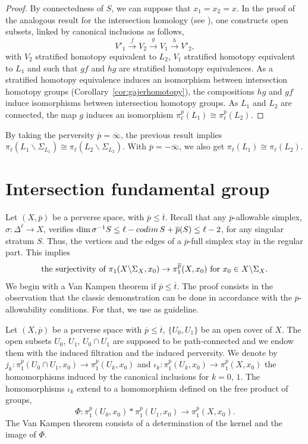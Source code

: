\documentclass[a4paper,10pt,english,reqno]{amsart}
\theoremstyle{plain}
\theoremstyle{definition}
\theoremstyle{remark}
\numberwithin{equation}{section}
\newcommand{\corref}[1]{Corollary~\ref{#1}}
\def\ov{\overline}
\def\codim{{\rm codim\,}}
\def\menos{\backslash}
\renewcommand\1{\hbox{\ding{192}}}
\renewcommand\2{\hbox{\ding{193}}}
\newcommand\3{\hbox{\ding{194}}}
\newcommand\4{\hbox{\ding{195}}}
\begin{document}
\begin{proof}
By connectedness of $S$, we can suppose that $x_1=x_2=x$.
In the proof of the analogous result for the intersection homology  (see \cite[Lemma 5.3.13]{FriedmanBook}),
one constructs  open subsets, linked by canonical inclusions as follows,
$$V'_{1}\xrightarrow{f}V_{2}\xrightarrow{g} V_{1}\xrightarrow{h}V'_{2},
$$
with $V_{2}$ stratified homotopy equivalent to $L_{2}$, $V_{1}$ stratified homotopy equivalent to $L_{1}$
and such that $gf$ and $hg$ are stratified homotopy equivalences.
 As a stratified homotopy equivalence induces an isomorphism between intersection homotopy groups 
(\corref{cor:gajerhomotopy}),
the compositions $hg$ and $gf$ induce isomorphisms between intersection homotopy groups.
As $L_{1}$ and $L_{2}$ are connected, the map  $g$ induces an isomorphism
$\pi_\ell^{\ov  p} (L_1) \cong \pi_\ell^{\ov  p} (L_2)$.
\end{proof}

By taking the perversity $\ov{p}=\ov{\infty}$, the previous result  implies 
$\pi_{\ell}(L_{1}\menos\Sigma_{L_{1}})\cong \pi_{\ell}(L_{2}\menos\Sigma_{L_{2}})$.
% 
With $\ov{p}=-\ov{\infty}$,
%
we also get $\pi_{\ell}(L_{1})\cong \pi_{\ell}(L_{2})$.


\section{Intersection fundamental group}\label{sec:piuno}

Let $(X,\ov{p})$ be a perverse  space, with $\ov{p}\leq \ov{t}$. 
%
Recall that any $\ov{p}$-allowable simplex, $\sigma\colon \Delta^\ell\to X$, verifies
$\dim \sigma^{-1}S\leq \ell -\codim S +\ov{p}(S)\leq \ell -2$,
for any singular stratum $S$.
Thus,  the vertices and the edges of a  $\ov{p}$-full simplex stay in the regular part.
%
This implies 
\begin{equation}\label{equa:pi1regular}
\text{
\emph{the surjectivity of} 
$\pi_{1}(X\menos\Sigma_{X},x_{0})\to \pi_{1}^{\ov{p}}(X,x_{0})$ for $x_{0}\in X\menos\Sigma_{X}$. 
}\end{equation}
%
We begin with a Van Kampen theorem if $\ov{p}\leq \ov{t}$.
The proof consists in the observation that the classic demonstration  can be done in accordance with the $\ov{p}$-allowability conditions.
For that, we use \cite[Section 1.2]{MR1867354} as guideline.

\smallskip
Let $(X,\ov{p})$ be a perverse space with $\ov{p}\leq \ov{t}$, $\{U_{0},U_{1}\}$  be an open cover of $X$. 
The open subsets $U_{0}$, $U_{1}$, $U_{0}\cap U_{1}$ are supposed to be path-connected and we endow them with the induced filtration and the induced perversity.
%
We denote by
$j_{k}\colon \pi_{1}^{\ov{p}}(U_{0}\cap U_{1},x_{0})\to \pi_{1}^{\ov{p}}(U_{k},x_{0})$ 
and 
$\iota_{k}\colon \pi_{1}^{\ov{p}}(U_{k},x_{0})\to  \pi_{1}^{\ov{p}}(X,x_{0})$
the homomorphisms induced by the canonical inclusions for $k=0,\,1$.
The homomorphisms $\iota_{k}$ extend to a homomorphism defined on the free product of groups,
$$\Phi\colon  \pi_{1}^{\ov{p}}(U_{0},x_{0})\ast \pi_{1}^{\ov{p}}(U_{1},x_{0})\to  \pi_{1}^{\ov{p}}(X,x_{0}).$$
The Van Kampen theorem consists of a determination of the kernel and the image of  $\Phi$.
\end{document}

